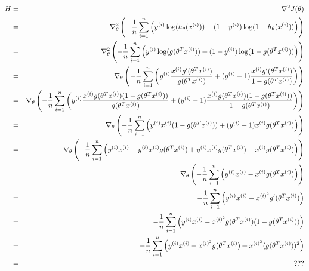 \begin{answer}
\begin{eqnarray*}
H&=&\nabla^2J(\theta)\\
&=&\nabla_\theta^2\left(-\frac{1}{{n}}\sum_{i=1}^{n}\left(y^{(i)}\log(h_{\theta}(x^{(i)}))+(1-y^{(i)})\log(1-h_{\theta}(x^{(i)}))\right)\right)\\
&=&\nabla_\theta^2\left(-\frac{1}{{n}}\sum_{i=1}^{n}\left(y^{(i)}\log(g(\theta^T x^{(i)}))+(1-y^{(i)})\log(1-g(\theta^T x^{(i)}))\right)\right)\\
&=&\nabla_\theta\left(-\frac{1}{{n}}\sum_{i=1}^{n}\left(y^{(i)}\frac{x^{(i)}g'(\theta^T x^{(i)})}{g(\theta^T x^{(i)})}+(y^{(i)}-1)\frac{x^{(i)}g'(\theta^T x^{(i)})}{1-g(\theta^T x^{(i)})}\right)\right)\\
&=&\nabla_\theta\left(-\frac{1}{{n}}\sum_{i=1}^{n}\left(y^{(i)}\frac{x^{(i)}g(\theta^T x^{(i)})(1-g(\theta^T x^{(i)}))}{g(\theta^T x^{(i)})}+(y^{(i)}-1)\frac{x^{(i)}g(\theta^T x^{(i)})(1-g(\theta^T x^{(i)}))}{1-g(\theta^T x^{(i)})}\right)\right)\\
&=&\nabla_\theta\left(-\frac{1}{{n}}\sum_{i=1}^{n}\left(y^{(i)}x^{(i)}(1-g(\theta^T x^{(i)}))+(y^{(i)}-1)x^{(i)}g(\theta^T x^{(i)})\right)\right)\\
&=&\nabla_\theta\left(-\frac{1}{{n}}\sum_{i=1}^{n}\left(y^{(i)}x^{(i)}-y^{(i)}x^{(i)}g(\theta^T x^{(i)})+y^{(i)}x^{(i)}g(\theta^T x^{(i)})-x^{(i)}g(\theta^T x^{(i)})\right)\right)\\
&=&\nabla_\theta\left(-\frac{1}{{n}}\sum_{i=1}^{n}\left(y^{(i)}x^{(i)}-x^{(i)}g(\theta^T x^{(i)})\right)\right)\\
&=&-\frac{1}{{n}}\sum_{i=1}^{n}\left(y^{(i)}x^{(i)}-x^{(i)^2}g'(\theta^T x^{(i)})\right)\\
&=&-\frac{1}{{n}}\sum_{i=1}^{n}\left(y^{(i)}x^{(i)}-x^{(i)^2}g(\theta^T x^{(i)})(1-g(\theta^T x^{(i)}))\right)\\
&=&-\frac{1}{{n}}\sum_{i=1}^{n}\left(y^{(i)}x^{(i)}-x^{(i)^2}g(\theta^T x^{(i)})+x^{(i)^2}(g(\theta^T x^{(i)}))^2\right)\\
&=&???\\
\end{eqnarray*}
\end{answer}
